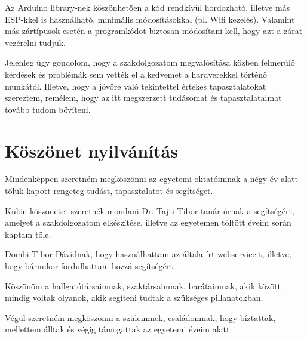 \documentclass[
]{thesis-ekf}
\theoremstyle{definition}
\theoremstyle{remark}
\begin{document}
Az Arduino library-nek köszönhetően a kód rendkívül hordozható, illetve más ESP-kkel is használható, minimális módosításokkal (pl. Wifi kezelés). Valamint más zártípusok esetén a programkódot biztosan módosítani kell, hogy azt a zárat vezérelni tudjuk.

Jelenleg úgy gondolom, hogy a szakdolgozatom megvalósítása közben felmerülő kérdések és problémák sem vették el a kedvemet a hardverekkel történő munkától. Illetve, hogy a jövőre való tekintettel értékes tapasztalatokat szereztem, remélem, hogy az itt megszerzett tudásomat és tapasztalataimat tovább tudom bővíteni.

\chapter*{Köszönet nyilvánítás}
Mindenképpen szeretném megköszönni az egyetemi oktatóimnak a négy év alatt tőlük kapott rengeteg tudást, tapasztalatot és segítséget.

Külön köszönetet szeretnék mondani Dr. Tajti Tibor tanár úrnak a segítségért, amelyet a szakdolgozatom elkészítése, illetve az egyetemen töltött éveim során kaptam tőle.

Dombi Tibor Dávidnak, hogy használhattam az általa írt webservice-t, illetve, hogy bármikor fordulhattam hozzá segítségért.

Köszönöm a hallgatótársaimnak, szaktársaimnak, barátaimnak, akik között mindig voltak olyanok, akik segíteni tudtak a szükséges pillanatokban.

Végül szeretném megköszönni a szüleimnek, családomnak, hogy bíztattak, mellettem álltak és végig támogattak az egyetemi éveim alatt.
\end{document}
